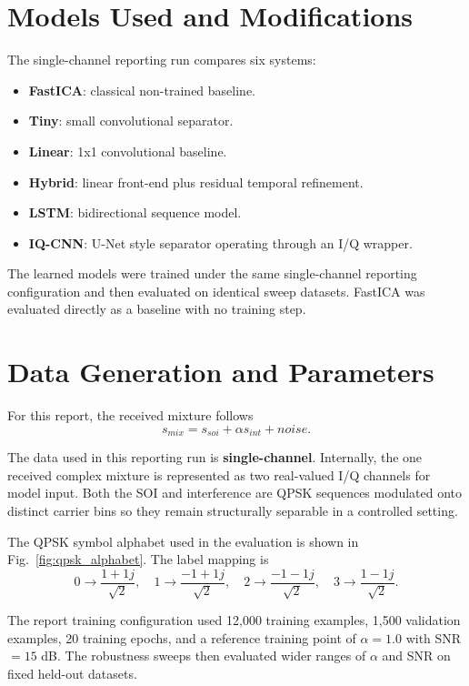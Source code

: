 \documentclass[conference]{IEEEtran}
\begin{document}
\section{Models Used and Modifications}
The single-channel reporting run compares six systems:
\begin{itemize}
    \item \textbf{FastICA}: classical non-trained baseline.
    \item \textbf{Tiny}: small convolutional separator.
    \item \textbf{Linear}: 1x1 convolutional baseline.
    \item \textbf{Hybrid}: linear front-end plus residual temporal refinement.
    \item \textbf{LSTM}: bidirectional sequence model.
    \item \textbf{IQ-CNN}: U-Net style separator operating through an I/Q wrapper.
\end{itemize}

The learned models were trained under the same single-channel reporting configuration and then evaluated on identical sweep datasets. FastICA was evaluated directly as a baseline with no training step.

\section{Data Generation and Parameters}
For this report, the received mixture follows
\begin{equation}
    s_{mix} = s_{soi} + \alpha s_{int} + noise .
\end{equation}

The data used in this reporting run is \textbf{single-channel}. Internally, the one received complex mixture is represented as two real-valued I/Q channels for model input. Both the SOI and interference are QPSK sequences modulated onto distinct carrier bins so they remain structurally separable in a controlled setting.

The QPSK symbol alphabet used in the evaluation is shown in Fig.~\ref{fig:qpsk_alphabet}. The label mapping is
\begin{equation}
    0 \rightarrow \frac{1 + 1j}{\sqrt{2}},\quad
    1 \rightarrow \frac{-1 + 1j}{\sqrt{2}},\quad
    2 \rightarrow \frac{-1 - 1j}{\sqrt{2}},\quad
    3 \rightarrow \frac{1 - 1j}{\sqrt{2}}.
\end{equation}

The report training configuration used 12{,}000 training examples, 1{,}500 validation examples, 20 training epochs, and a reference training point of $\alpha = 1.0$ with SNR $=15$ dB. The robustness sweeps then evaluated wider ranges of $\alpha$ and SNR on fixed held-out datasets.
\end{document}
